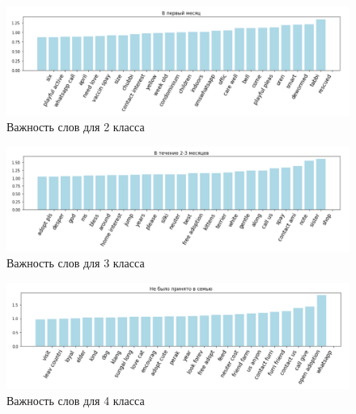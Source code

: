 \documentclass[14pt]{mmcs_article}
\begin{document}
\begin{figure}[H]
	\centering
	\includegraphics[scale=0.55]{words2.png}
	\caption{Важность слов для 2 класса}\label{text:words2}
\end{figure}

\begin{figure}[H]
	\centering
	\includegraphics[scale=0.55]{words3.png}
	\caption{Важность слов для 3 класса}\label{text:words3}
\end{figure}

\begin{figure}[H]
	\centering
	\includegraphics[scale=0.55]{words4.png}
	\caption{Важность слов для 4 класса}\label{text:words4}
\end{figure}
\end{document}
